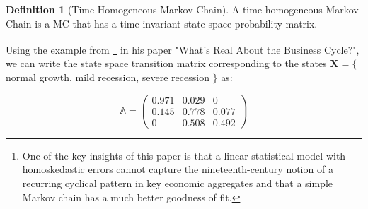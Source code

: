 \documentclass[a4paper,12pt]{article}
\theoremstyle{definition}
\newtheorem{definition}{Definition}[section]
\begin{document}
\begin{definition}[Time Homogeneous Markov Chain]
A time homogeneous Markov Chain is a MC that has a time invariant state-space probability matrix. 
\end{definition}

Using the example from \cite{hamilton05}\footnote{One of the key insights of this paper is  that a linear statistical model with homoskedastic errors cannot capture the nineteenth-century notion of a recurring cyclical pattern in key economic aggregates and that a simple Markov chain has a much better goodness of fit.} in his paper "What's Real About the Business Cycle?", we can write the state space transition matrix corresponding to the states $\mathbf{X}= \{$normal growth, mild recession, severe recession $\}$ as:

\begin{equation*}
\mathbb{A} = \left( \begin{array}{ccc}
0.971 & 0.029 & 0 \\
0.145 & 0.778 & 0.077 \\
0 & 0.508 & 0.492
\end{array} \right)
\end{equation*}
\end{document}
